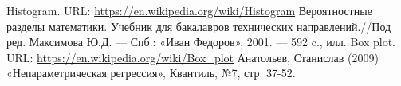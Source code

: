 
\begin{thebibliography}{}
      Histogram. URL: \url{https://en.wikipedia.org/wiki/Histogram}
      Вероятностные разделы математики. Учебник для бакалавров технических направлений.//Под ред. Максимова Ю.Д. — Спб.: «Иван Федоров», 2001. — 592 c., илл.
      Box plot. URL: \url{https://en.wikipedia.org/wiki/Box_plot}
      Анатольев, Станислав (2009) «Непараметрическая регрессия», Квантиль, №7, стр. 37-52.
\end{thebibliography}